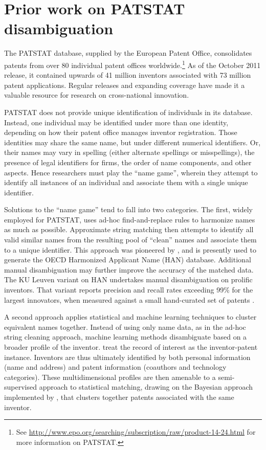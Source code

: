 \documentclass[11pt]{article}
\begin{document}
\section{Prior work on PATSTAT disambiguation}
\label{sec:prior}

The PATSTAT database, supplied by the European Patent Office,
consolidates patents from over 80 individual patent offices
worldwide.\footnote{See
  \url{http://www.epo.org/searching/subscription/raw/product-14-24.html}
for more information on PATSTAT.} As of the October 2011 release, it contained upwards of 41
million inventors associated with 73 million patent
applications. Regular releases and expanding coverage have made it a
valuable resource for research on cross-national innovation. 

PATSTAT does not provide unique identification of individuals in its
database. Instead, one individual may be identified under more than
one identity, depending on how their patent office manages inventor
registration. Those identities may share the same name, but under
different numerical identifiers. Or, their names may vary in spelling
(either alternate spellings or misspellings), the presence of legal
identifiers for firms, the order of name components, and other
aspects. Hence researchers must play the ``name game'', wherein they
attempt to identify all instances of an individual and associate them
with a single unique identifier.

Solutions to the ``name game'' tend to fall into two categories. The
first, widely employed for PATSTAT, uses ad-hoc find-and-replace rules
to harmonize names as much as possible. Approximate string matching
then attempts to identify all valid similar names from the resulting
pool of ``clean'' names and associate them
to a unique identifier. This approach was pioneered by
\cite{raffo2009play}, and is presently used to generate the OECD Harmonized
Applicant Name (HAN) database. Additional manual disambiguation may further
improve the accuracy of the matched data. The KU Leuven variant on HAN
undertakes manual disambiguation on prolific inventors. That variant reports precision and
recall rates exceeding 99\% for the largest innovators, when measured
against a small hand-curated set of patents \citep{callaert2011patent}.

A second approach applies statistical and machine learning techniques
to cluster equivalent names together. Instead of using only name data,
as in the ad-hoc string cleaning approach, machine learning methods
disambiguate based on a broader profile of the
inventor. \cite{lai2011disambiguation} treat the record of interest as
the inventor-patent instance. Inventors are thus ultimately identified
by both personal information (name and address) and patent information
(coauthors and technology categories). These multidimensional profiles
are then amenable to a semi-supervised approach to statistical
matching, drawing on the Bayesian approach implemented by
\cite{torvik2005probabilistic}, that clusters together patents
associated with the same inventor.
\end{document}

